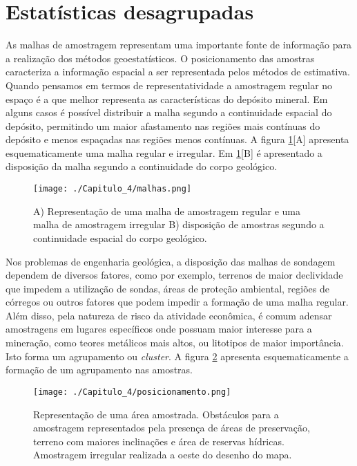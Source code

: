 \section{Estatísticas desagrupadas} \label{demons_krig} 

As malhas de amostragem representam uma importante fonte de informação para a realização dos métodos geoestatísticos. O posicionamento das amostras caracteriza a informação espacial a ser representada pelos métodos de estimativa. Quando pensamos em termos de representatividade a amostragem regular no espaço é a que melhor representa as características do depósito mineral. Em alguns casos é possível distribuir a malha segundo a continuidade espacial do depósito, permitindo um maior afastamento nas regiões mais contínuas do depósito e menos espaçadas nas regiões menos contínuas. A figura \ref{malhas}[A] apresenta esquematicamente uma malha regular e irregular. Em \ref{malhas}[B] é apresentado a disposição da malha segundo a continuidade do corpo geológico.

\FloatBarrier
\begin{figure}[!htpb]
	\centering
	\texttt{[image: ./Capitulo\_4/malhas.png]}	
	\caption{A) Representação de uma malha de amostragem regular e uma malha de amostragem irregular B) disposição de amostras segundo a continuidade espacial do corpo geológico.}
	\label{malhas}
\end{figure}
\FloatBarrier 

Nos problemas de engenharia geológica, a disposição das malhas de sondagem dependem de diversos fatores, como por exemplo, terrenos de maior declividade que impedem a utilização de sondas, áreas de proteção ambiental, regiões de córregos ou outros fatores que podem impedir a formação de uma malha regular. Além disso, pela natureza de risco da atividade econômica, é comum adensar amostragens em lugares específicos onde possuam maior interesse para a mineração, como teores metálicos mais altos, ou litotipos de maior importância. Isto forma um agrupamento ou \textit{cluster}. A figura \ref{posicionamento} apresenta esquematicamente a formação de um agrupamento nas amostras.

\FloatBarrier
\begin{figure}[!htpb]
	\centering
	\texttt{[image: ./Capitulo\_4/posicionamento.png]}	
	\caption{Representação de uma área amostrada. Obstáculos para a amostragem representados pela presença de áreas de preservação, terreno com maiores inclinações e área de reservas hídricas. Amostragem irregular realizada a oeste do desenho do mapa.}
	\label{posicionamento}
\end{figure}
\FloatBarrier 

